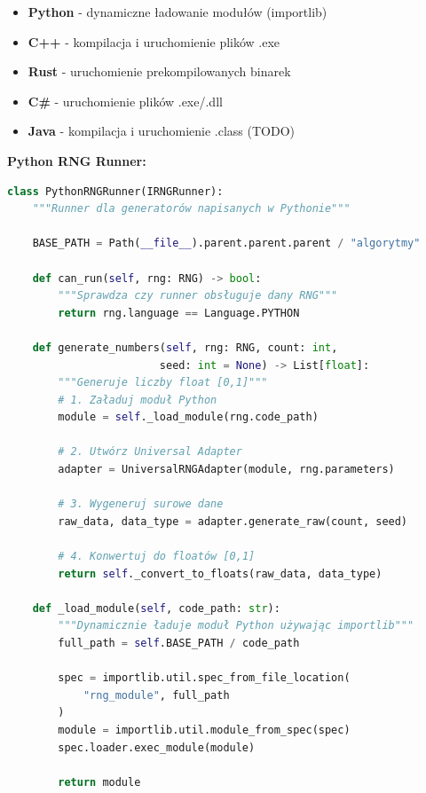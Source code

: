 \documentclass[12pt,a4paper]{article}
\begin{document}
\begin{tcolorbox}[colback=green!5!white,colframe=green!75!black,title=Obsługiwane języki]
\begin{itemize}
    \item \textbf{Python} - dynamiczne ładowanie modułów (importlib)
    \item \textbf{C++} - kompilacja i uruchomienie plików .exe
    \item \textbf{Rust} - uruchomienie prekompilowanych binarek
    \item \textbf{C\#} - uruchomienie plików .exe/.dll
    \item \textbf{Java} - kompilacja i uruchomienie .class (TODO)
\end{itemize}
\end{tcolorbox}

\textbf{Python RNG Runner:}

\begin{lstlisting}[language=Python, caption=PythonRNGRunner - wykonywanie generatorów Python]
class PythonRNGRunner(IRNGRunner):
    """Runner dla generatorów napisanych w Pythonie"""

    BASE_PATH = Path(__file__).parent.parent.parent / "algorytmy"

    def can_run(self, rng: RNG) -> bool:
        """Sprawdza czy runner obsługuje dany RNG"""
        return rng.language == Language.PYTHON

    def generate_numbers(self, rng: RNG, count: int,
                        seed: int = None) -> List[float]:
        """Generuje liczby float [0,1]"""
        # 1. Załaduj moduł Python
        module = self._load_module(rng.code_path)

        # 2. Utwórz Universal Adapter
        adapter = UniversalRNGAdapter(module, rng.parameters)

        # 3. Wygeneruj surowe dane
        raw_data, data_type = adapter.generate_raw(count, seed)

        # 4. Konwertuj do floatów [0,1]
        return self._convert_to_floats(raw_data, data_type)

    def _load_module(self, code_path: str):
        """Dynamicznie ładuje moduł Python używając importlib"""
        full_path = self.BASE_PATH / code_path

        spec = importlib.util.spec_from_file_location(
            "rng_module", full_path
        )
        module = importlib.util.module_from_spec(spec)
        spec.loader.exec_module(module)

        return module
\end{lstlisting}
\end{document}
